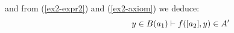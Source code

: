 \noindent
				and from (\ref{ex2-expr2}) and (\ref{ex2-axiom}) we deduce: \begin{equation}
				\hspace{2cm}y \in B(a_1) \vdash f([a_2], y) \in A'\label{ex2-expr3}
				\end{equation}
			